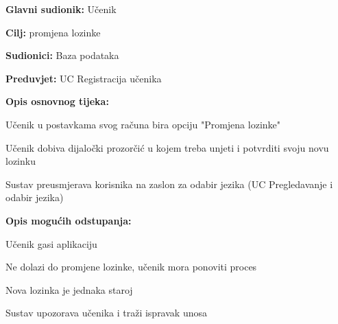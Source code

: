 					\noindent {}
					\begin{packed_item}
	
						\item \textbf{Glavni sudionik:} Učenik
						\item  \textbf{Cilj:} promjena lozinke
						\item  \textbf{Sudionici:} Baza podataka
						\item  \textbf{Preduvjet:} UC Registracija učenika
						\item  \textbf{Opis osnovnog tijeka:}
						
						\item[] \begin{packed_enum}
	
							\item Učenik u postavkama svog računa bira opciju "Promjena lozinke"
							\item Učenik dobiva dijaločki prozorčić u kojem treba unjeti i potvrditi svoju novu lozinku
							\item Sustav preusmjerava korisnika na zaslon za odabir jezika (UC Pregledavanje i odabir jezika)
						\end{packed_enum}
						
						\item  \textbf{Opis mogućih odstupanja:}
						
						\item[] \begin{packed_item}
	
							\item[1.a]Učenik gasi aplikaciju
							\item[] \begin{packed_enum}
								
								\item Ne dolazi do promjene lozinke, učenik mora ponoviti proces					
							\end{packed_enum}

							\item[2.a] Nova lozinka je jednaka staroj
							\item[] \begin{packed_enum}
								
								\item Sustav upozorava učenika i traži ispravak unosa  								
							\end{packed_enum}
							
						\end{packed_item}
					\end{packed_item}
				
